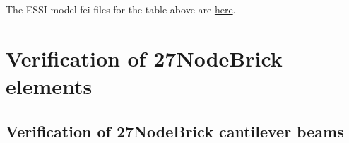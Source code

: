 \documentclass[fleqn,11pt,letter]{article}
\begin{document}
The ESSI model fei files for the table above are \href{https://github.com/yuan-energy/ESSI_Verification/blob/master/8NodeBrick/circular_plate_simply_support/circular_plate_simply_support.tar.gz?raw=true}{here}.


































































\newpage

\section{Verification of 27NodeBrick elements}
\subsection{Verification of 27NodeBrick cantilever beams}

\end{document}
